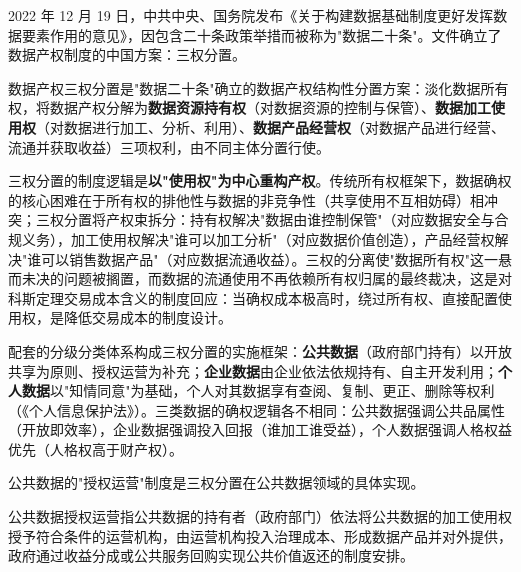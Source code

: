 2022 年 12 月 19 日，中共中央、国务院发布《关于构建数据基础制度更好发挥数据要素作用的意见》，因包含二十条政策举措而被称为"数据二十条"。文件确立了数据产权制度的中国方案：三权分置。

\begin{definition}
数据产权三权分置是"数据二十条"确立的数据产权结构性分置方案：淡化数据所有权，将数据产权分解为\textbf{数据资源持有权}（对数据资源的控制与保管）、\textbf{数据加工使用权}（对数据进行加工、分析、利用）、\textbf{数据产品经营权}（对数据产品进行经营、流通并获取收益）三项权利，由不同主体分置行使。
\end{definition}

三权分置的制度逻辑是\textbf{以"使用权"为中心重构产权}。传统所有权框架下，数据确权的核心困难在于所有权的排他性与数据的非竞争性（共享使用不互相妨碍）相冲突；三权分置将产权束拆分：持有权解决"数据由谁控制保管"（对应数据安全与合规义务），加工使用权解决"谁可以加工分析"（对应数据价值创造），产品经营权解决"谁可以销售数据产品"（对应数据流通收益）。三权的分离使"数据所有权"这一悬而未决的问题被搁置，而数据的流通使用不再依赖所有权归属的最终裁决，这是对科斯定理交易成本含义的制度回应：当确权成本极高时，绕过所有权、直接配置使用权，是降低交易成本的制度设计。

配套的分级分类体系构成三权分置的实施框架：\textbf{公共数据}（政府部门持有）以开放共享为原则、授权运营为补充；\textbf{企业数据}由企业依法依规持有、自主开发利用；\textbf{个人数据}以"知情同意"为基础，个人对其数据享有查阅、复制、更正、删除等权利（《个人信息保护法》）。三类数据的确权逻辑各不相同：公共数据强调公共品属性（开放即效率），企业数据强调投入回报（谁加工谁受益），个人数据强调人格权益优先（人格权高于财产权）。

公共数据的"授权运营"制度是三权分置在公共数据领域的具体实现。

\begin{definition}
公共数据授权运营指公共数据的持有者（政府部门）依法将公共数据的加工使用权授予符合条件的运营机构，由运营机构投入治理成本、形成数据产品并对外提供，政府通过收益分成或公共服务回购实现公共价值返还的制度安排。
\end{definition}

